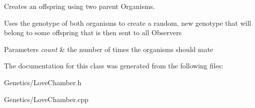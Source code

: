 Creates an offspring using two parent Organisms. 

Uses the genotype of both organisms to create a random, new genotype that will belong to some offspring that is then sent to all Observers 
\begin{DoxyParams}{Parameters}
{\em count} & the number of times the organisms should mate \\
\hline
\end{DoxyParams}


The documentation for this class was generated from the following files\+:\begin{DoxyCompactItemize}
\item 
Genetics/Love\+Chamber.\+h\item 
Genetics/Love\+Chamber.\+cpp\end{DoxyCompactItemize}
